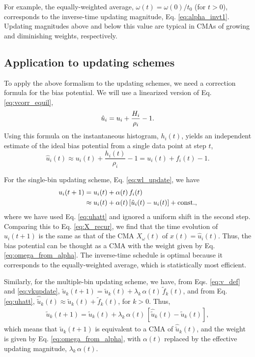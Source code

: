 \documentclass[reprint, superscriptaddress, floatfix]{revtex4-1}
\begin{document}
For example,
the equally-weighted average, $\omega(t) = \omega(0)/t_0$ (for $t > 0$),
corresponds to the inverse-time updating magnitude,
Eq. \eqref{eq:alpha_invt1}.
%
Updating magnitudes above and below this value
are typical in CMAs of
growing and diminishing weights, respectively.


\subsection{\label{sec:ave_us}
Application to updating schemes}

To apply the above formalism to the updating schemes,
we need a correction formula for the bias potential.
%
We will use a linearized version of Eq. \eqref{eq:vcorr_equil},
%
\begin{equation}
  \hat u_i = u_i + \frac{ H_i } { \rho_i } -1
  .
  \notag
\end{equation}
%
Using this formula on
the instantaneous histogram, $h_i(t)$,
yields an independent estimate of the ideal bias potential
from a single data point at step $t$,
%
\begin{equation}
  \hat u_i(t)
  \approx u_i(t) + \frac{ h_i(t) } { \rho_i } - 1
  = u_i(t) + f_i(t) - 1
  .
  \label{eq:uhatt}
\end{equation}

For the single-bin updating scheme, Eq. \eqref{eq:wl_update},
we have
\begin{align}
  u_i(t+1)
  &=
  u_i(t) + \alpha(t) \, f_i(t)
  \notag \\
  &\approx
  u_i(t) + \alpha(t) \, [\hat u_i(t) - u_i(t)] + \mathrm{const.}
  ,
  \notag
\end{align}
where we have used Eq. \eqref{eq:uhatt}
and ignored a uniform shift in the second step.
%
Comparing this to Eq. \eqref{eq:X_recur},
we find that the time evolution of $u_i(t+1)$
is the same as that of the CMA $X_\omega(t)$
of $x(t) = \hat u_i(t)$.
%
Thus, the bias potential can be thought as
a CMA with the weight given by Eq. \eqref{eq:omega_from_alpha}.
%
The inverse-time schedule is optimal
because it corresponds to the equally-weighted average,
which is statistically most efficient.

Similarly, for the multiple-bin updating scheme,
we have, from Eqs. \eqref{eq:v_def} and \eqref{eq:vkupdate},
${\tilde u}_k(t + 1) = {\tilde u}_k(t) + \lambda_k \, \alpha(t) \, {\tilde f}_k(t)$,
and from Eq. \eqref{eq:uhatt},
$\hat{\tilde u}_k(t) \approx {\tilde u}_k(t) + {\tilde f}_k(t)$,
for $k > 0$.
Thus,
\begin{align*}
  \tilde u_k(t+1) = \tilde u_k(t) + \lambda_k \, \alpha(t) \,
  \left[
    \hat{\tilde u}_k(t) - \tilde u_k(t)
  \right]
  ,
\end{align*}
%
which means that
$\tilde u_k(t+1)$ is equivalent to
a CMA of $\hat{\tilde u}_k(t)$,
and the weight is given by Eq. \eqref{eq:omega_from_alpha},
with $\alpha(t)$ replaced by the effective updating magnitude,
$\lambda_k \, \alpha(t)$.
\end{document}
